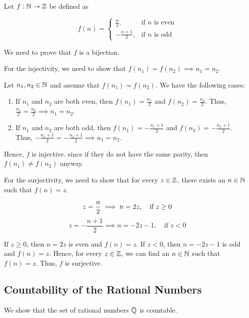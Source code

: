 Let \(f: \mathbb{N} \to \mathbb{Z}\) be defined as

\[
	f(n) = \begin{cases}
		\frac{n}{2},      & \text{if } n \text{ is even} \\
		-\frac{n + 1}{2}, & \text{if } n \text{ is odd}
	\end{cases}
\]

We need to prove that \(f\) is a bijection.

For the injectivity, we need to show that \(f(n_1) = f(n_2) \implies n_1 = n_2\).

Let \(n_1, n_2 \in \mathbb{N}\) and assume that \(f(n_1) = f(n_2)\). We have the following cases:

\begin{enumerate}
	\item If \(n_1\) and \(n_2\) are both even, then \(f(n_1) = \frac{n_1}{2}\) and \(f(n_2) = \frac{n_2}{2}\). Thus, \(\frac{n_1}{2} = \frac{n_2}{2} \implies n_1 = n_2\).

	\item If \(n_1\) and \(n_2\) are both odd, then \(f(n_1) = -\frac{n_1 + 1}{2}\) and \(f(n_2) = -\frac{n_2 + 1}{2}\).
	      Thus, \(-\frac{n_1 + 1}{2} = -\frac{n_2 + 1}{2} \implies n_1 = n_2\).

\end{enumerate}

Hence, \(f\) is injective. since if they do not have the same parity, then \(f(n_1) \neq f(n_2)\) anyway.

For the surjectivity, we need to show that for every \(z \in \mathbb{Z}\), there exists an \(n \in \mathbb{N}\) such that \(f(n) = z\).

\[
	z = \frac{n}{2} \implies n = 2z, \quad \text{if } z \geq 0 \\
\]
\[
	z = -\frac{n + 1}{2} \implies n = -2z - 1, \quad \text{if } z < 0
\]

If \(z \geq 0\), then \(n = 2z\) is even and \(f(n) = z\). If \(z < 0\), then \(n = -2z - 1\) is odd and \(f(n) = z\).
Hence, for every \(z \in \mathbb{Z}\), we can find an \(n \in \mathbb{N}\) such that \(f(n) = z\). Thus, \(f\) is surjective.

\QED

\subsection{Countability of the Rational Numbers}

We show that the set of rational numbers \( \mathbb{Q} \) is countable.

